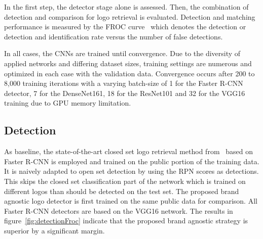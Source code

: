 \documentclass[a4paper,twoside]{article}
\begin{document}
In the first step, the detector stage alone is assessed. Then, the combination of detection and comparison for logo retrieval is evaluated. 
Detection and matching performance is measured by the \ac{FROC} curve~\cite{miller1969} which denotes the detection or detection and identification rate versus the number of false detections.

In all cases, the \acp{CNN} are trained until convergence. Due to the diversity of applied networks and differing dataset sizes, training settings are numerous and optimized in each case with the validation data. Convergence occurs after 200 to 8,000 training iterations with a varying batch-size of 1 for the Faster R-CNN detector, 7 for the DenseNet161, 18 for the ResNet101 and 32 for the VGG16 training due to GPU memory limitation.

\subsection{Detection}
As baseline, the state-of-the-art closed set logo retrieval method from~\cite{su2016} based on Faster R-CNN is employed and trained on the public portion of the training data.
It is naively adapted to open set detection by using the \ac{RPN} scores as detections. This skips the closed set classification part of the network which is trained on different logos than should be detected on the test set.
The proposed brand agnostic logo detector is first trained on the same public data for comparison. All Faster R-CNN detectors are based on the VGG16 network.
The results in figure~\ref{fig:detectionFroc} indicate that the proposed brand agnostic strategy is superior by a significant margin. 
%
\end{document}
